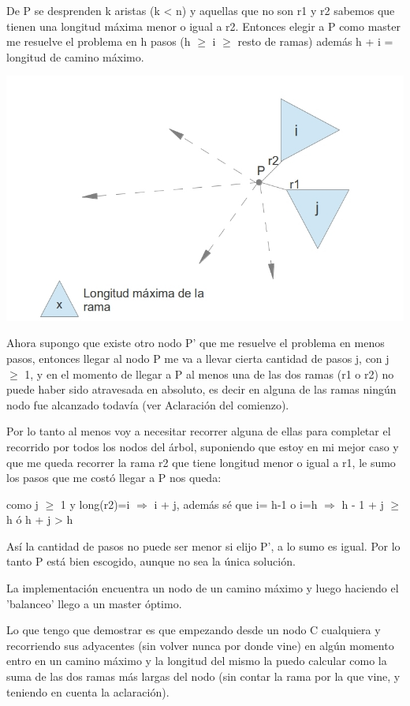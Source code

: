 De P se desprenden k aristas (k < n) y aquellas que no son r1 y r2 sabemos que tienen una longitud máxima menor o igual a r2. Entonces elegir a P como master me resuelve el problema en h pasos (h $\geq$ i $\geq$ resto de ramas) además h + i = longitud de camino máximo.
\begin{center}
\includegraphics[scale=0.4]{ej2/2/graficos/imagen03.jpg} 
\end{center}
Ahora supongo que existe otro nodo P' que me resuelve el problema en menos pasos, entonces llegar al nodo P me va a llevar cierta cantidad de pasos j, con j $\geq$ 1, y en el momento de llegar a P al menos una de las dos ramas (r1 o r2) no puede haber sido atravesada en absoluto, es decir en alguna de las ramas ningún nodo fue alcanzado todavía (ver Aclaración del comienzo). 

Por lo tanto al menos voy a necesitar recorrer alguna de ellas para completar el recorrido por todos los nodos del árbol, suponiendo que estoy en mi mejor caso y que me queda recorrer la rama r2 que tiene longitud menor o igual a r1, le sumo los pasos que me costó llegar a P nos queda:

 como j $\geq$ 1 y long(r2)=i $\Rightarrow$ i + j, además sé que i= h-1 o i=h $\Rightarrow$  h - 1 + j $\geq$ h ó h + j > h

Así la cantidad de pasos no puede ser menor si elijo P', a lo sumo es igual. Por lo tanto P está bien escogido, aunque no sea la única solución.


La implementación encuentra un nodo de un camino máximo y luego haciendo el 'balanceo' llego a un master óptimo.

Lo que tengo que demostrar es que empezando desde un nodo C cualquiera y recorriendo sus adyacentes (sin volver nunca por donde vine) en algún momento entro en un camino máximo y la longitud del mismo la puedo calcular como la suma de las dos ramas más largas del nodo (sin contar la rama por la que vine, y teniendo en cuenta la aclaración).

